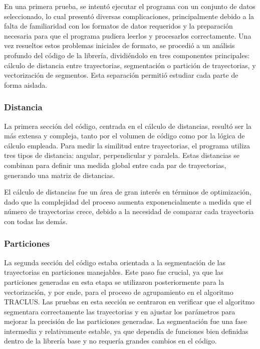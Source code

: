 En una primera prueba, se intentó ejecutar el programa con un conjunto de datos seleccionado, lo cual presentó diversas complicaciones, principalmente debido a la falta de familiaridad con los formatos de datos requeridos y la preparación necesaria para que el programa pudiera leerlos y procesarlos correctamente. Una vez resueltos estos problemas iniciales de formato, se procedió a un análisis profundo del código de la librería, dividiéndolo en tres componentes principales: cálculo de distancia entre trayectorias, segmentación o partición de trayectorias, y vectorización de segmentos. Esta separación permitió estudiar cada parte de forma aislada.

\subsubsection{Distancia}

La primera sección del código, centrada en el cálculo de distancias, resultó ser la más extensa y compleja, tanto por el volumen de código como por la lógica de cálculo empleada. Para medir la similitud entre trayectorias, el programa utiliza tres tipos de distancia: angular, perpendicular y paralela. Estas distancias se combinan para definir una medida global entre cada par de trayectorias, generando una matriz de distancias.

El cálculo de distancias fue un área de gran interés en términos de optimización, dado que la complejidad del proceso aumenta exponencialmente a medida que el número de trayectorias crece, debido a la necesidad de comparar cada trayectoria con todas las demás.

\subsubsection{Particiones}

La segunda sección del código estaba orientada a la segmentación de las trayectorias en particiones manejables. Este paso fue crucial, ya que las particiones generadas en esta etapa se utilizaron posteriormente para la vectorización, y por ende, para el proceso de agrupamiento en el algoritmo TRACLUS. Las pruebas en esta sección se centraron en verificar que el algoritmo segmentara correctamente las trayectorias y en ajustar los parámetros para mejorar la precisión de las particiones generadas. La segmentación fue una fase intermedia y relativamente estable, ya que dependía de funciones bien definidas dentro de la librería base y no requería grandes cambios en el código.

